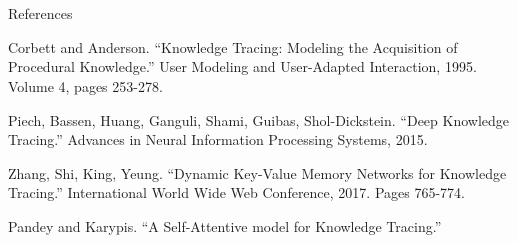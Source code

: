 \documentclass{beamer}
\theoremstyle{definition}
\begin{document}
\section{}
\begin{frame}{References}
\begin{thebibliography}{2}
\tiny

 Corbett and Anderson. ``Knowledge Tracing: Modeling the Acquisition of Procedural Knowledge.'' User Modeling and User-Adapted Interaction, 1995. Volume 4, pages 253-278.

 Piech, Bassen, Huang, Ganguli, Shami, Guibas, Shol-Dickstein. ``Deep Knowledge Tracing.'' Advances in Neural Information Processing Systems, 2015.

 Zhang, Shi, King, Yeung. ``Dynamic Key-Value Memory Networks for Knowledge Tracing.'' International World Wide Web Conference, 2017. Pages 765-774.

 Pandey and Karypis. ``A Self-Attentive model for Knowledge Tracing.''

\end{thebibliography}
\end{frame}
\end{document}
